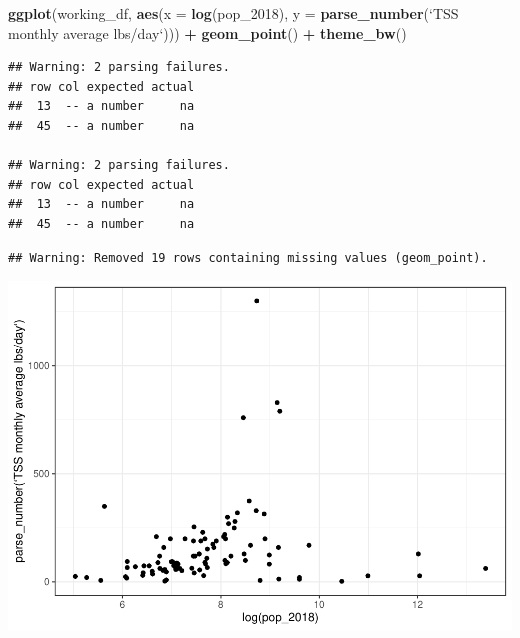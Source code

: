 \documentclass[
]{article}
\newenvironment{Shaded}{\begin{snugshade}}{\end{snugshade}}
\newcommand{\DataTypeTok}[1]{\textcolor[rgb]{0.13,0.29,0.53}{#1}}
\newcommand{\DecValTok}[1]{\textcolor[rgb]{0.00,0.00,0.81}{#1}}
\newcommand{\KeywordTok}[1]{\textcolor[rgb]{0.13,0.29,0.53}{\textbf{#1}}}
\newcommand{\NormalTok}[1]{#1}
\newcommand{\OperatorTok}[1]{\textcolor[rgb]{0.81,0.36,0.00}{\textbf{#1}}}
\newcommand{\OtherTok}[1]{\textcolor[rgb]{0.56,0.35,0.01}{#1}}
\newcommand{\StringTok}[1]{\textcolor[rgb]{0.31,0.60,0.02}{#1}}
\begin{document}
\begin{Shaded}
\begin{Highlighting}[]
\KeywordTok{ggplot}\NormalTok{(working_df, }\KeywordTok{aes}\NormalTok{(}\DataTypeTok{x =} \KeywordTok{log}\NormalTok{(pop_}\DecValTok{2018}\NormalTok{),}
                       \DataTypeTok{y =} \KeywordTok{parse_number}\NormalTok{(}\StringTok{`}\DataTypeTok{TSS monthly average lbs/day}\StringTok{`}\NormalTok{))) }\OperatorTok{+}
\StringTok{  }\KeywordTok{geom_point}\NormalTok{() }\OperatorTok{+}
\StringTok{  }\KeywordTok{theme_bw}\NormalTok{()}
\end{Highlighting}
\end{Shaded}

\begin{verbatim}
## Warning: 2 parsing failures.
## row col expected actual
##  13  -- a number     na
##  45  -- a number     na

## Warning: 2 parsing failures.
## row col expected actual
##  13  -- a number     na
##  45  -- a number     na
\end{verbatim}

\begin{verbatim}
## Warning: Removed 19 rows containing missing values (geom_point).
\end{verbatim}

\includegraphics{data-viz_files/figure-latex/unnamed-chunk-3-1.pdf}

\begin{Shaded}
\end{Shaded}
\end{document}
